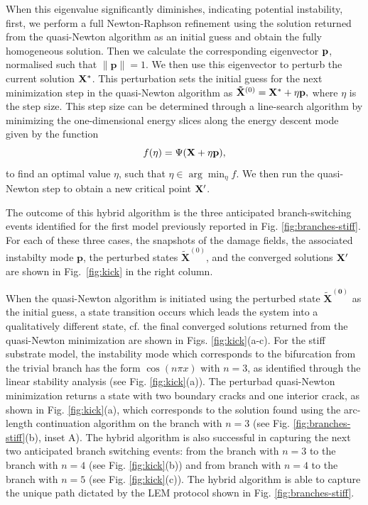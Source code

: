 \documentclass[10pt]{article}
\begin{document}
When this eigenvalue significantly diminishes, indicating potential instability, first, we perform a full Newton-Raphson refinement using the solution returned from the quasi-Newton algorithm as an initial guess and obtain the fully homogeneous solution. Then we calculate the corresponding eigenvector \(\mathbf{p}\), normalised such that $\|\textbf{p}\|=1$. 
We then use this eigenvector to perturb the current solution $\mathbf{X^*}$. This perturbation sets the initial guess for the next minimization step in the quasi-Newton algorithm as $\mathbf{\tilde X}^{(0)} = \mathbf{X^*} + \eta \mathbf{p},
$ where \(\eta\) is the step size.
%
%
This step size can be determined through a line-search algorithm by minimizing the one-dimensional energy slices along the energy descent mode given by the function 
\begin{equation}
    f(\eta) = \Psi(\mathbf{X} + \eta \mathbf{p}),
\label{eqn:energy-slice}
\end{equation}
 to find an optimal value \(\eta\), such that $\eta \in \arg \min_{\eta} f$. {We then run the quasi-Newton step to obtain a new critical point $\mathbf{X}'$.}

The outcome of this hybrid algorithm is the three anticipated branch-switching events identified for the first model previously reported in Fig. \ref{fig:branches-stiff}. For each of these three cases, the snapshots of the damage fields, the associated {instabilty mode} \(\mathbf{p}\), the perturbed states \(\mathbf{\tilde X}^{(0)}\), and the converged solutions $\mathbf{X}'$ are shown in Fig.~\ref{fig:kick} in the right column.

When the quasi-Newton algorithm is initiated using the perturbed state \(\mathbf{\tilde X^{(0)}}\)
%
as the initial guess, {a state transition} occurs which leads the system into a qualitatively different state, cf. the final  converged solutions returned from the quasi-Newton minimization are shown in Figs. \ref{fig:kick}(a-c). For the stiff substrate model, the {instability mode} which corresponds to the bifurcation from the trivial branch has the form \(\cos(n\pi x)\) with \(n=3\), as identified through the linear stability analysis (see Fig. \ref{fig:kick}(a)). 
The perturbad quasi-Newton minimization returns a state with two boundary cracks and one interior crack, as shown in Fig. \ref{fig:kick}(a), which corresponds to the solution found using the arc-length continuation algorithm on the branch with \(n=3\) (see Fig. \ref{fig:branches-stiff}(b), inset A).  The hybrid algorithm is also successful in capturing the next two anticipated branch   switching events: from the  branch with \(n=3\)  to the branch  with \(n=4\) (see Fig. \ref{fig:kick}(b)) and  from branch with \(n=4\)  to the branch  with \(n=5\) (see Fig. \ref{fig:kick}(c)). The hybrid algorithm is able to capture the unique path dictated by the LEM protocol shown in Fig. \ref{fig:branches-stiff}.   
\end{document}
